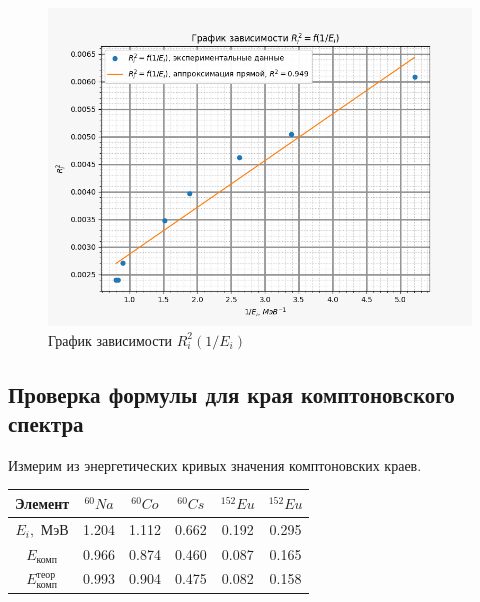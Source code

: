     \begin{figure}[H]
        \centering
        \includegraphics[width = 14 cm]{images/R2_and_invE}
        \caption{График зависимости $R_i^2(1/E_i)$}
        \label{R2_and_invE}
    \end{figure}

\subsection{Проверка формулы для края комптоновского спектра}

    Измерим из энергетических кривых значения комптоновских краев. 

    \begin{table}[h!]
        \centering
        \begin{tabular}{|c|c|c|c|c|c|}
            \hline
            Элемент                         & $^{60}Na$ & $^{60}Co$ & $^{60}Cs$ & $^{152}Eu$ & $^{152}Eu$ \\ \hline
            $E_i,$ МэВ                      & 1.204     & 1.112     & 0.662     & 0.192      & 0.295      \\ \hline
            $E_{\text{комп}}$               & 0.966     & 0.874     & 0.460     & 0.087      & 0.165      \\ \hline
            $E_{\text{комп}}^{\text{теор}}$ & 0.993     & 0.904     & 0.475     & 0.082      & 0.158      \\ \hline
        \end{tabular}
    \end{table}

